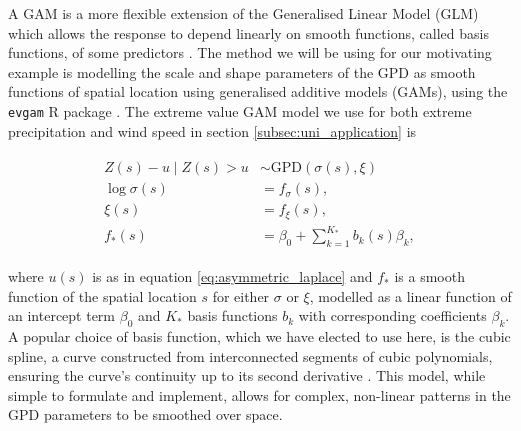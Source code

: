 \documentclass{article}
\numberwithin{equation}{section}
\begin{document}
A GAM is a more flexible extension of the Generalised Linear Model (GLM) which allows the response to depend linearly on smooth functions, called basis functions, of some predictors \citep{Wood2006}.
The method we will be using for our motivating example is modelling the scale and shape parameters of the GPD as smooth functions of spatial location using generalised additive models (GAMs), using the \texttt{evgam} R package \citep{Youngman2022}.
The extreme value GAM model we use for both extreme precipitation and wind speed in section \ref{subsec:uni_application} is
\begin{center}
  \begin{align} \label{eq:gpd_gam}
    \begin{split}
      Z(s) - u \mid Z(s) > u &\sim \text{GPD}(\sigma(s), \xi) \\
      \log{\sigma(s)} &= f_{\sigma}(s), \\
              \xi(s) &= f_{\xi}(s), \\
              f_*(s) &= \beta_0 + \sum_{k=1}^{K_*}b_k(s)\beta_k,
    \end{split}
  \end{align}
\end{center}
where $u(s)$ is as in equation \eqref{eq:asymmetric_laplace} and $f_*$ is a smooth function of the spatial location $s$ for either $\sigma$ or $\xi$, modelled as a linear function of an intercept term $\beta_0$ and $K_*$ basis functions $b_k$ with corresponding coefficients $\beta_k$. 
A popular choice of basis function, which we have elected to use here, is the cubic spline, a curve constructed from interconnected segments of cubic polynomials, ensuring the curve's continuity up to its second derivative \citep{Wood2006}. 
This model, while simple to formulate and implement, allows for complex, non-linear patterns in the GPD parameters to be smoothed over space.
\end{document}
